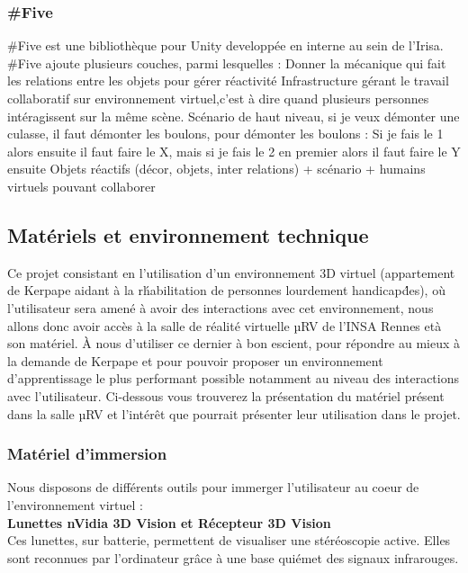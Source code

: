 	\subsubsection{\#Five}
		\#Five est une bibliothèque pour Unity developpée en interne au sein de l’Irisa. #Five ajoute plusieurs couches, parmi lesquelles : 
		Donner la mécanique qui fait les relations entre les objets pour gérer réactivité
		Infrastructure gérant le travail collaboratif sur environnement virtuel,c’est à dire quand plusieurs personnes intéragissent sur la même scène.
		Scénario de haut niveau, si je veux démonter une culasse, il faut démonter les boulons, pour démonter les boulons : Si je fais le 1 alors ensuite il faut faire le X, mais si je fais le 2 en premier alors il faut faire le Y ensuite
		Objets réactifs (décor, objets, inter relations) + scénario + humains virtuels pouvant collaborer


\subsection{Mat\'eriels et environnement technique}

Ce projet consistant en l'utilisation d'un environnement 3D virtuel (appartement de Kerpape aidant \`a la r\'habilitation de personnes lourdement handicap\'des), o\`u l'utilisateur sera amen\'e \`a avoir des interactions avec cet environnement, nous allons donc avoir acc\`es \`a la salle de r\'ealit\'e virtuelle µRV de l'INSA Rennes et\`a son mat\'eriel. \`A nous d'utiliser ce dernier \`a bon escient, pour r\'epondre au mieux \`a la demande de Kerpape et pour pouvoir proposer un environnement d'apprentissage le plus performant possible notamment au niveau des interactions avec l'utilisateur. 
Ci-dessous vous trouverez la pr\'esentation du mat\'eriel pr\'esent dans la salle µRV et l'int\'er\^et que pourrait pr\'esenter leur utilisation dans le projet.

\subsubsection{Mat\'eriel d'immersion}
Nous disposons de diff\'erents outils pour immerger l'utilisateur au coeur de l'environnement virtuel : 
\\

\textbf{Lunettes nVidia 3D Vision et R\'ecepteur 3D Vision}
\\

Ces lunettes, sur batterie, permettent de visualiser une st\'er\'eoscopie active. Elles sont reconnues par l'ordinateur gr\^ace \`a une base qui\'emet des signaux infrarouges.
\\

